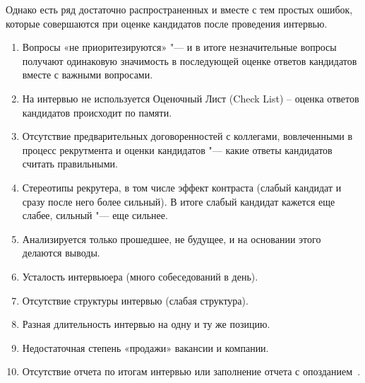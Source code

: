 \documentclass{../industrial-development}
\begin{document}
Однако есть ряд достаточно распространенных и вместе с тем простых ошибок, которые совершаются при оценке кандидатов после проведения интервью.
 \begin{enumerate}	
 \item Вопросы «не приоритезируются» "--- и в итоге незначительные вопросы получают одинаковую значимость в последующей оценке ответов кандидатов вместе с важными вопросами.

 \item На интервью не используется Оценочный Лист (Check List) – оценка ответов кандидатов происходит по памяти.

 \item Отсутствие предварительных договоренностей с коллегами, вовлеченными в процесс рекрутмента и оценки кандидатов "--- какие ответы кандидатов считать правильными.

 \item Стереотипы рекрутера, в том числе эффект контраста (слабый кандидат и сразу после него более сильный). В итоге слабый кандидат кажется еще слабее, сильный "--- еще сильнее.

 \item Анализируется только прошедшее, не будущее, и на основании этого делаются выводы.

 \item Усталость интервьюера (много собеседований в день).

 \item Отсутствие структуры интервью (слабая структура).

 \item Разная длительность интервью на одну и ту же позицию.

 \item Недостаточная степень «продажи» вакансии и компании.

 \item Отсутствие отчета по итогам интервью или заполнение отчета с опозданием~\cite{Samyerasp}. 
\end{enumerate}




\end{document}
